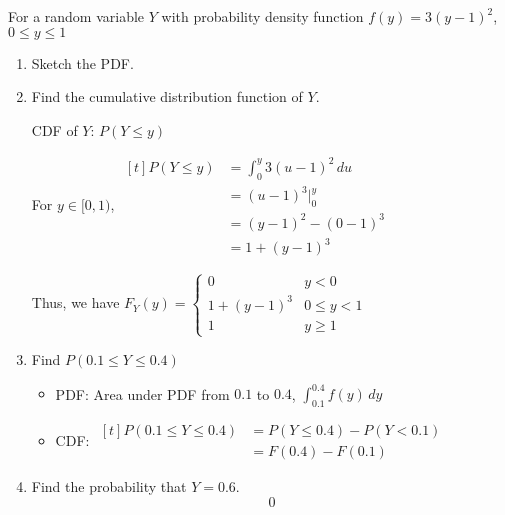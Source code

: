 \begin{example}
    For a random variable $Y$ with probability density function $f(y) = 3(y - 1)^2$, $0 \le y \le 1$

    \begin{enumerate}[label=\alph*)]
        \item Sketch the PDF.

        \begin{center}
        \end{center}
        
        \item Find the cumulative distribution function of $Y$.
        
        CDF of $Y$: $P(Y \le y)$

        For $y \in [0, 1)$, $\begin{aligned}[t]
            P(Y \le y) & = \int_0^y 3(u - 1)^2 \,du \\
                       & = (u - 1)^3 \bigg|_0^y \\
                       & = (y - 1)^2 - (0 - 1)^3 \\
                       & = 1 + (y - 1)^3
        \end{aligned}$

        Thus, we have $F_Y(y) = \begin{cases} 0 & y < 0 \\ 1 + (y - 1)^3 & 0 \le y < 1 \\ 1 & y \ge 1 \end{cases}$

        \item Find $P(0.1 \le Y \le 0.4)$
        
        \begin{itemize}
            \item PDF: Area under PDF from $0.1$ to $0.4$, $\int_{0.1}^{0.4} f(y) \,dy$
            \item CDF: $\begin{aligned}[t]
                P(0.1 \le Y \le 0.4) & = P(Y \le 0.4) - P(Y < 0.1) \\
                                     & = F(0.4) - F(0.1)
            \end{aligned}$
        \end{itemize}

        \item Find the probability that $Y = 0.6$.
        $$0$$
    \end{enumerate}
\end{example}

